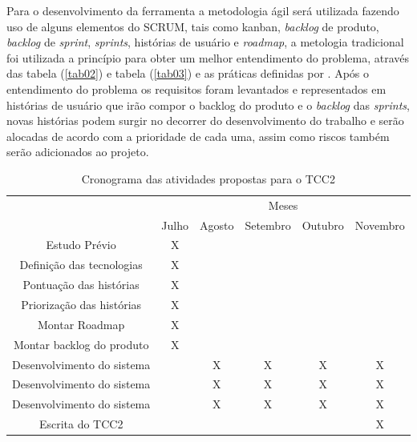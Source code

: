 Para o desenvolvimento da ferramenta a metodologia ágil será utilizada fazendo uso de alguns elementos do SCRUM, tais como kanban, \textit{backlog} de produto, \textit{backlog} de \textit{sprint}, \textit{sprints}, histórias de usuário e \textit{roadmap}, a metologia tradicional foi utilizada a princípio para  obter um melhor entendimento do problema, através das tabela (\ref{tab02}) e  tabela (\ref{tab03}) e  as práticas definidas por \cite{pressman2009engenharia}. Após o entendimento do problema os requisitos foram levantados e representados em histórias de usuário que irão compor o backlog do produto e o \textit{backlog} das \textit{sprints}, novas histórias podem surgir no decorrer do desenvolvimento do trabalho e serão alocadas de acordo com a prioridade de cada uma, assim como riscos também serão adicionados ao projeto. 

\begin{table}[!htpb]
\centering

\begin{small} 
  
\setlength{\tabcolsep}{3pt} 


\begin{tabular}{|c|c|c|c|c|c|}\hline
 & \multicolumn{5}{c|}{Meses}\\ \cline{2-6}
\raisebox{1.5ex}{Atividades} & Julho & Agosto & Setembro & Outubro & Novembro \\  \hline

Estudo Prévio & X & & & & \\ \hline
Definição das tecnologias & X & & & & \\ \hline
Pontuação das histórias & X & & & & \\ \hline
Priorização das histórias & X & & & & \\ \hline
Montar Roadmap & X & & & & \\ \hline
Montar backlog do produto & X & & & &\\ \hline
Desenvolvimento do sistema & & X & X & X & X \\ \hline
Desenvolvimento do sistema & & X & X & X & X \\ \hline
Desenvolvimento do sistema & & X & X & X & X \\ \hline
Escrita do TCC2 & & & & & X \\ \hline


\end{tabular} 
\end{small}
\caption{Cronograma das atividades propostas para o TCC2\label{t_cronograma2}
}
\end{table} 

